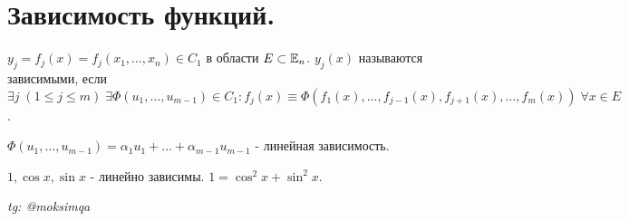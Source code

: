 \documentclass[../main.tex]{subfiles}
\begin{document}
\section{Зависимость функций.}


\begin{definition}
 $y_{j} = f_{j}(x) = f_{j}(x_{1},\dots,x_{n}) \in C_{1} $ в области $E \subset \mathbb{E}_{n}$. $y_{j}(x)$ называются зависимыми, если $\exists j \;(1\leqslant j \leqslant m) \; \exists \varPhi (u_{1},\dots,u_{m-1})\in C_{1} : f_{j}(x) \equiv \varPhi (f_{1}(x),\dots,f_{j-1}(x),f_{j+1}(x),\dots,f_{m}(x)) \; \forall x \in E$.
\end{definition}
$\varPhi( u_{1},\dots,u_{m-1}) = \alpha_{1} u_{1}+ \dots + \alpha_{m-1} u_{m-1}$ - линейная зависимость. 

\noindent $1, \cos{x}, \sin{x}$ - линейно зависимы. \qquad $1=\cos^{2}{x} + \sin^{2}{x}$.



\vspace{1cm}
\begin{flushright}
    \textit{tg: @moksimqa}
\end{flushright}
\end{document}
